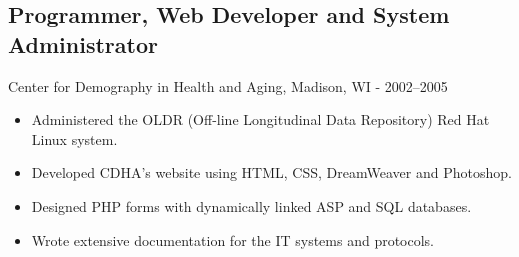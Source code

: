 \documentclass[../main.tex]{subfiles}
\begin{document}
\subsection*{Programmer, Web Developer and System Administrator}
     Center for Demography in Health and Aging, Madison, WI - 2002--2005
	\begin{itemize}
		\item{Administered the OLDR (Off-line Longitudinal Data Repository) Red Hat Linux system.}
		\item{Developed CDHA's website using HTML, CSS, DreamWeaver and Photoshop.}
		\item{Designed PHP forms with dynamically linked ASP and SQL databases. }
		\item{Wrote extensive documentation for the IT systems and protocols.}
	\end{itemize}
\end{document}
